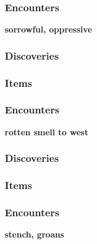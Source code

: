 \subsubsection{Encounters}
\begin{itemize}
\end{itemize}

\textbf{sorrowful, oppressive}
\begin{DndReadAloud}
\end{DndReadAloud}
\subsubsection{Discoveries}
\begin{itemize}
\end{itemize}
\subsubsection{Items}
\begin{itemize}
\end{itemize}
\subsubsection{Encounters}
\begin{itemize}
\end{itemize}

\textbf{rotten smell to west}
\begin{DndReadAloud}
\end{DndReadAloud}
\subsubsection{Discoveries}
\begin{itemize}
\end{itemize}
\subsubsection{Items}
\begin{itemize}
\end{itemize}
\subsubsection{Encounters}
\begin{itemize}
\end{itemize}

\textbf{stench, groans}
\begin{DndReadAloud}
\end{DndReadAloud}
